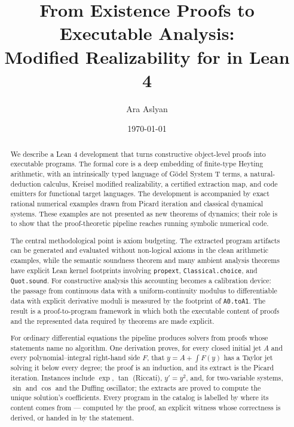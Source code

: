 \documentclass[11pt,a4paper]{article}
\title{\textbf{From Existence Proofs to Executable Analysis:\\
Modified Realizability for \texorpdfstring{\HAomega}{HAomega} in Lean 4}}
\author{Ara Aslyan}
\date{\today}
\theoremstyle{definition}
\theoremstyle{remark}
\newcommand{\lean}[1]{\texttt{\nolinkurl{#1}}}
\begin{document}
\maketitle

\begin{abstract}
We describe a Lean 4 development that turns constructive object-level proofs
into executable programs.  The formal core is a deep embedding of finite-type
Heyting arithmetic, with an intrinsically typed language of G\"odel System T
terms, a natural-deduction calculus, Kreisel modified realizability, a
certified extraction map, and code emitters for functional target languages.
The development is accompanied by exact rational numerical examples drawn
from Picard iteration and classical dynamical systems.  These examples are not
presented as new theorems of dynamics; their role is to show that the
proof-theoretic pipeline reaches running symbolic numerical code.

The central methodological point is axiom budgeting.  The extracted program
artifacts can be generated and evaluated without non-logical axioms in the
clean arithmetic examples, while the semantic soundness theorem and many
ambient analysis theorems have explicit Lean kernel footprints involving
\lean{propext}, \lean{Classical.choice}, and \lean{Quot.sound}.  For
constructive analysis this accounting becomes a calibration device: the
passage from continuous data with a uniform-continuity modulus to differentiable
data with explicit derivative moduli is measured by the footprint of
\lean{A0.toA1}.  The result is a proof-to-program framework in which both the
executable content of proofs and the represented data required by theorems are
made explicit.

For ordinary differential equations the pipeline produces solvers from proofs
whose statements name no algorithm. One derivation proves, for every closed
initial jet \(A\) and every polynomial--integral right-hand side \(F\), that
\(y = A + \int F(y)\) has a Taylor jet solving it below every degree; the proof
is an induction, and its extract is the Picard iteration. Instances include
\(\exp\), \(\tan\) (Riccati), \(y' = y^2\), and, for two-variable systems,
\(\sin\) and \(\cos\) and the Duffing oscillator; the extracts are proved to
compute the unique solution's coefficients. Every program in the catalog is
labelled by where its content comes from --- computed by the proof, an
explicit witness whose correctness is derived, or handed in by the statement.
\end{abstract}
\end{document}
